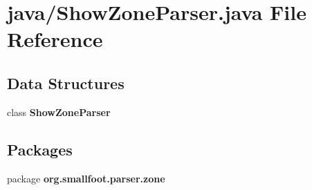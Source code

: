 \section{java/\-Show\-Zone\-Parser.java File Reference}
\label{ShowZoneParser_8java}
\subsection*{Data Structures}
\begin{DoxyCompactItemize}
\item 
class {\bf Show\-Zone\-Parser}
\end{DoxyCompactItemize}
\subsection*{Packages}
\begin{DoxyCompactItemize}
\item 
package {\bf org.\-smallfoot.\-parser.\-zone}
\end{DoxyCompactItemize}
